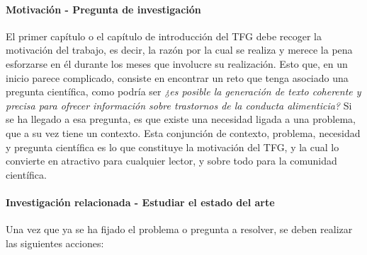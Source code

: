 \paragraph{Motivación - Pregunta de investigación} El primer capítulo o el capítulo de introducción del TFG debe recoger la motivación del trabajo, es decir, la razón por la cual se realiza y merece la pena esforzarse en él durante los meses que involucre su realización. Esto que, en un inicio parece complicado, consiste en encontrar un reto que tenga asociado una pregunta científica, como podría ser \textit{¿es posible la generación de texto coherente y precisa para ofrecer información sobre trastornos de la conducta alimenticia?} Si se ha llegado a esa pregunta, es que existe una necesidad ligada a una problema, que a su vez tiene un contexto. Esta conjunción de contexto, problema, necesidad y pregunta científica es lo que constituye la motivación del TFG, y la cual lo convierte en atractivo para cualquier lector, y sobre todo para la comunidad científica.

\paragraph{Investigación relacionada - Estudiar el estado del arte} Una vez que ya se ha fijado el problema o pregunta a resolver, se deben realizar las siguientes acciones:

